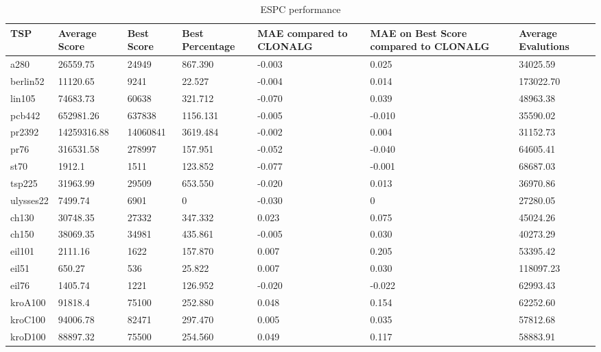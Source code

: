 \begin{table}[H]
	\begin{tabular}{|l|p{2cm}|p{1.6cm}|p{2.2cm}|p{2.4cm}|p{2.4cm}|p{1.7cm}|}
		\hline
		TSP       & Average Score & Best Score & Best Percentage &\textbf{ MAE compared to CLONALG} & MAE on Best Score compared to CLONALG & Average Evalutions \\ \hline
		a280      & 26559.75      & 24949      & 867.390     & -0.003            & 0.025       & 34025.59           \\ \hline
		berlin52  & 11120.65      & 9241       & 22.527     & -0.004            & 0.014       & 173022.70          \\ \hline
		lin105    & 74683.73      & 60638      & 321.712     & -0.070            & 0.039       & 48963.38           \\ \hline
		pcb442    & 652981.26     & 637838     & 1156.131     & -0.005            & -0.010      & 35590.02           \\ \hline
		pr2392    & 14259316.88   & 14060841   & 3619.484     & -0.002            & 0.004       & 31152.73           \\ \hline
		pr76      & 316531.58     & 278997     & 157.951     & -0.052            & -0.040      & 64605.41           \\ \hline
		st70      & 1912.1        & 1511       & 123.852     & -0.077            & -0.001      & 68687.03           \\ \hline
		tsp225    & 31963.99      & 29509      & 653.550     & -0.020            & 0.013       & 36970.86           \\ \hline
		ulysses22 & 7499.74       & 6901       & 0               & -0.030            & 0                 & 27280.05           \\ \hline
		ch130     & 30748.35      & 27332      & 347.332     & 0.023             & 0.075       & 45024.26           \\ \hline
		ch150     & 38069.35      & 34981      & 435.861     & -0.005             & 0.030       & 40273.29           \\ \hline
		eil101    & 2111.16       & 1622       & 157.870     & 0.007             & 0.205       & 53395.42           \\ \hline
		eil51     & 650.27        & 536        & 25.822     & 0.007             & 0.030       & 118097.23          \\ \hline
		eil76     & 1405.74       & 1221       & 126.952     & -0.020            & -0.022      & 62993.43           \\ \hline
		kroA100   & 91818.4       & 75100      & 252.880     & 0.048             & 0.154        & 62252.60           \\ \hline
		kroC100   & 94006.78      & 82471      & 297.470     & 0.005             & 0.035       & 57812.68           \\ \hline
		kroD100   & 88897.32      & 75500      & 254.560     & 0.049             & 0.117       & 58883.91           \\ \hline
	\end{tabular}
	\caption{ESPC performance}
	\label{tab:espc}
\end{table}
